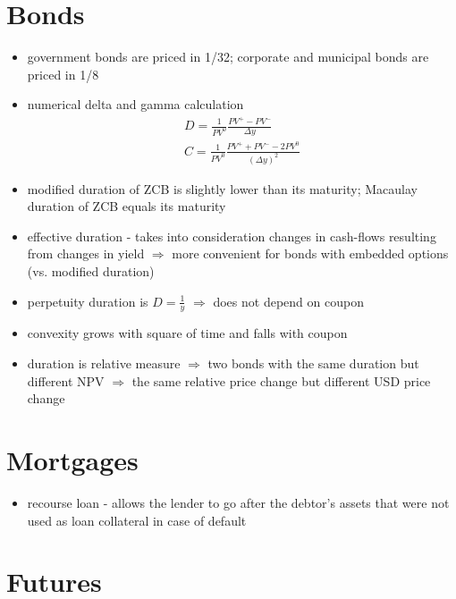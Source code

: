 \section{Bonds}

\begin{itemize}
\item government bonds are priced in 1/32; corporate and municipal bonds are priced in 1/8
\item numerical delta and gamma calculation
\begin{gather*}
D = \frac{1}{PV^0}\frac{PV^+ - PV^-}{\Delta y}\\
C = \frac{1}{PV^0}\frac{PV^+ + PV^- - 2PV^0}{(\Delta y)^2}
\end{gather*}
\item modified duration of ZCB is slightly lower than its maturity; Macaulay duration of ZCB equals its maturity
\item effective duration - takes into consideration changes in cash-flows resulting from changes in yield $\Rightarrow$ more convenient for bonds with embedded options (vs. modified duration)
\item perpetuity duration is $D = \frac{1}{y}$ $\Rightarrow$ does not depend on coupon
\item convexity grows with square of time and falls with coupon
\item duration is relative measure $\Rightarrow$ two bonds with the same duration but different NPV $\Rightarrow$ the same relative price change but different USD price change
\end{itemize}

\section{Mortgages}
\begin{itemize}
\item recourse loan - allows the lender to go after the debtor's assets that were not used as loan collateral in case of default
\end{itemize}

\section{Futures}

